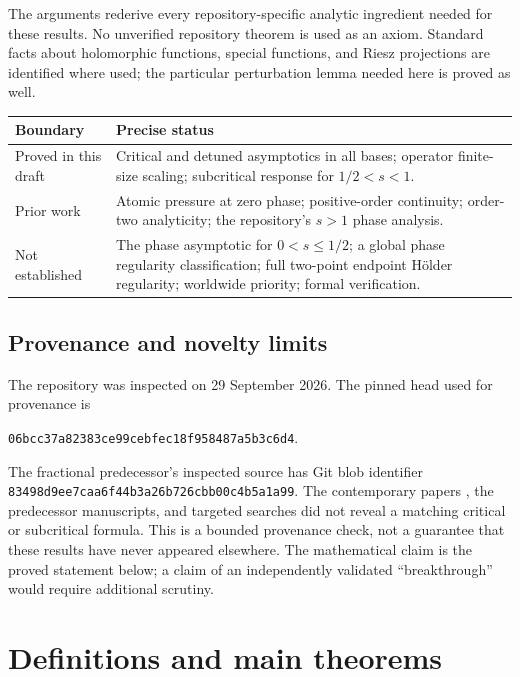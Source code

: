 \documentclass[11pt,a4paper]{article}
\numberwithin{equation}{section}
\theoremstyle{definition}
\theoremstyle{remark}
\begin{document}
The arguments rederive every repository-specific analytic ingredient
needed for these results. No unverified repository theorem is used as an
axiom. Standard facts about holomorphic functions, special functions, and
Riesz projections are identified where used; the particular perturbation
lemma needed here is proved as well.

\begin{center}
\begin{tabular}{@{}p{}p{}@{}}
\toprule
\textbf{Boundary} & \textbf{Precise status}\\
\midrule
Proved in this draft & Critical and detuned asymptotics in all bases;
operator finite-size scaling; subcritical response for $1/2<s<1$.\\[1.5mm]
Prior work & Atomic pressure at zero phase; positive-order continuity;
order-two analyticity; the repository's $s>1$ phase analysis.\\[1.5mm]
Not established & The phase asymptotic for $0<s\le1/2$; a global phase
regularity classification; full two-point endpoint H\"older regularity;
worldwide priority; formal verification.\\
\bottomrule
\end{tabular}
\end{center}

\subsection{Provenance and novelty limits}
The repository was inspected on 29 September 2026. The pinned head used
for provenance is
\begin{center}\small
\nolinkurl{06bcc37a82383ce99cebfec18f958487a5b3c6d4}.
\end{center}
The fractional predecessor's inspected source has Git blob identifier
\nolinkurl{83498d9ee7caa6f44b3a26b726cbb00c4b5a1a99}.
The contemporary papers \cite{GKS,GLS}, the predecessor manuscripts,
and targeted searches did not reveal a matching critical or subcritical
formula. This is a bounded provenance check, not a guarantee that these
results have never appeared elsewhere. The mathematical claim is the
proved statement below; a claim of an independently validated
``breakthrough'' would require additional scrutiny.

\section{Definitions and main theorems}
\label{sec:main}
\end{document}
